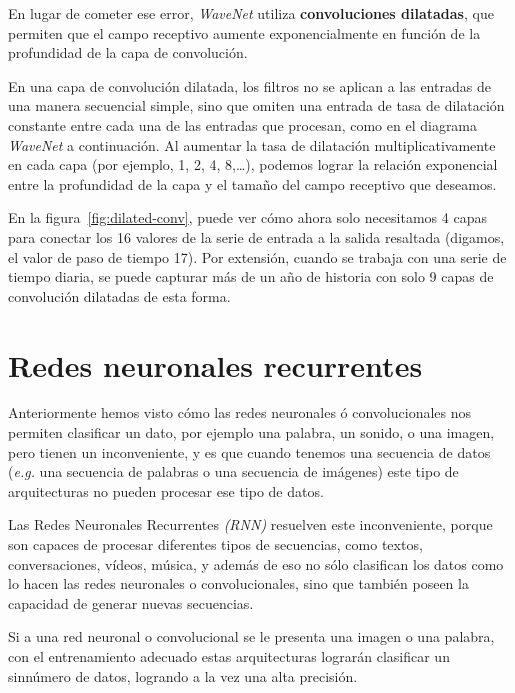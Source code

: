 \documentclass[a4paper,12pt]{article}
\begin{document}
\clearpage

En lugar de cometer ese error, \textit{WaveNet} utiliza \textbf{convoluciones dilatadas}, que permiten que el campo receptivo aumente exponencialmente en función de la profundidad de la capa de convolución. 

En una capa de convolución dilatada, los filtros no se aplican a las entradas de una manera secuencial simple, sino que omiten una entrada de tasa de dilatación constante entre cada una de las entradas que procesan, como en el diagrama \textit{WaveNet} a continuación. Al aumentar la tasa de dilatación multiplicativamente en cada capa (por ejemplo, 1, 2, 4, 8,…), podemos lograr la relación exponencial entre la profundidad de la capa y el tamaño del campo receptivo que deseamos. 

En la figura~\ref{fig:dilated-conv}, puede ver cómo ahora solo necesitamos 4 capas para conectar los 16 valores de la serie de entrada a la salida resaltada (digamos, el valor de paso de tiempo 17). Por extensión, cuando se trabaja con una serie de tiempo diaria, se puede capturar más de un año de historia con solo 9 capas de convolución dilatadas de esta forma.

\clearpage

\section{Redes neuronales recurrentes}
Anteriormente hemos visto cómo las redes neuronales ó convolucionales nos permiten clasificar un dato, por ejemplo una palabra, un sonido, o una imagen, pero tienen un inconveniente, y es que cuando tenemos una secuencia de datos (\textit{e.g.} una secuencia de palabras o una secuencia de imágenes) este tipo de arquitecturas no pueden procesar ese tipo de datos. 

Las Redes Neuronales Recurrentes \textit{(RNN)} \citep{karpathy:rnn} resuelven este inconveniente, porque son capaces de procesar diferentes tipos de secuencias, como textos, conversaciones, vídeos, música, y además de eso no sólo clasifican los datos como lo hacen las redes neuronales o convolucionales, sino que también poseen la capacidad de generar nuevas secuencias.

Si a una red neuronal o convolucional se le presenta una imagen o una palabra, con el entrenamiento adecuado estas arquitecturas lograrán clasificar un sinnúmero de datos, logrando a la vez una alta precisión. 
\end{document}
